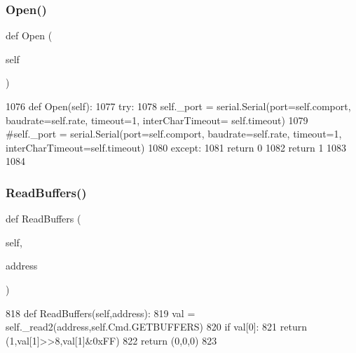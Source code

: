 \subsubsection{\texorpdfstring{Open()}{Open()}}
{\footnotesize\ttfamily def Open (\begin{DoxyParamCaption}\item[{}]{self }\end{DoxyParamCaption})}


\begin{DoxyCode}
1076     \textcolor{keyword}{def }Open(self):
1077         \textcolor{keywordflow}{try}:
1078             self.\_port = serial.Serial(port=self.comport, baudrate=self.rate, timeout=1, interCharTimeout=
      self.timeout)
1079             \textcolor{comment}{#self.\_port = serial.Serial(port=self.comport, baudrate=self.rate, timeout=1,
       interCharTimeout=self.timeout)}
1080         \textcolor{keywordflow}{except}:
1081             \textcolor{keywordflow}{return} 0
1082         \textcolor{keywordflow}{return} 1
1083 
1084 \end{DoxyCode}
\mbox{\label{classtoxic__hardware_1_1roboclaw__3_1_1Roboclaw_a0ccc774bd702e611c98c01313707b8fe}} 
\subsubsection{\texorpdfstring{Read\+Buffers()}{ReadBuffers()}}
{\footnotesize\ttfamily def Read\+Buffers (\begin{DoxyParamCaption}\item[{}]{self,  }\item[{}]{address }\end{DoxyParamCaption})}


\begin{DoxyCode}
818     \textcolor{keyword}{def }ReadBuffers(self,address):
819         val = self.\_read2(address,self.Cmd.GETBUFFERS)
820         \textcolor{keywordflow}{if} val[0]:
821             \textcolor{keywordflow}{return} (1,val[1]>>8,val[1]&0xFF)
822         \textcolor{keywordflow}{return} (0,0,0)
823 
\end{DoxyCode}
\mbox{\label{classtoxic__hardware_1_1roboclaw__3_1_1Roboclaw_ac9359f88c9e1b9b23e09ba962bc2774e}} 
